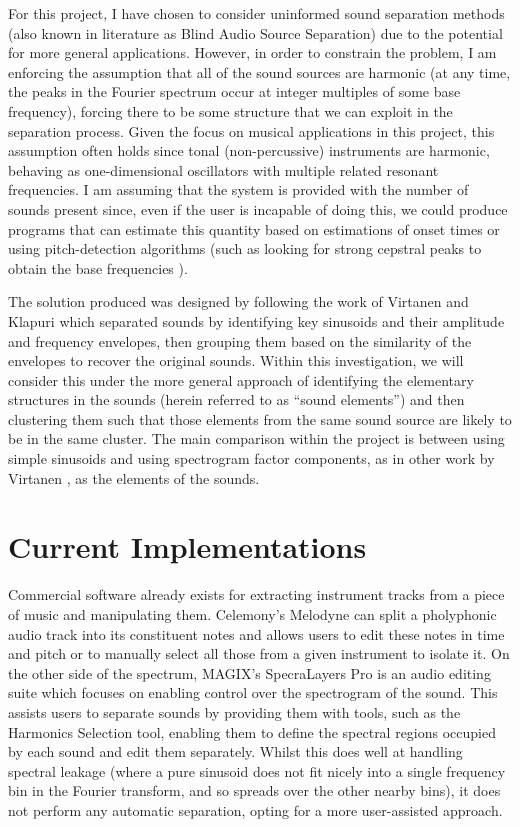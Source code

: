 \documentclass[12pt,a4paper,twoside,openright]{report}
\begin{document}
For this project, I have chosen to consider uninformed sound separation methods (also known in literature as Blind Audio Source Separation) due to the potential for more general applications. However, in order to constrain the problem, I am enforcing the assumption that all of the sound sources are harmonic (at any time, the peaks in the Fourier spectrum occur at integer multiples of some base frequency), forcing there to be some structure that we can exploit in the separation process. {\color{red}Given the focus on musical applications in this project, this assumption often holds since tonal (non-percussive) instruments are harmonic, behaving as one-dimensional oscillators with multiple related resonant frequencies.} I am assuming that the system is provided with the number of sounds present since, even if the user is incapable of doing this, we could produce programs that can estimate this quantity based on estimations of onset times or using pitch-detection algorithms (such as looking for strong cepstral peaks to obtain the base frequencies \cite{noll1967cepstrum}).

The solution produced was designed by following the work of Virtanen and Klapuri \cite{virtanen2000separation} which separated sounds by identifying key sinusoids and their amplitude and frequency envelopes, then grouping them based on the similarity of the envelopes to recover the original sounds. Within this investigation, we will consider this under the more general approach of identifying the elementary structures in the sounds (herein referred to as ``sound elements'') and then clustering them such that those elements from the same sound source are likely to be in the same cluster. The main comparison within the project is between using simple sinusoids and using spectrogram factor components, as in other work by Virtanen \cite{virtanen2003sound}, as the elements of the sounds.

\section{Current Implementations}

Commercial software already exists for extracting instrument tracks from a piece of music and manipulating them. Celemony's Melodyne \cite{melodyne} can split a pholyphonic audio track into its constituent notes and allows users to edit these notes in time and pitch or to manually select all those from a given instrument to isolate it. On the other side of the spectrum, MAGIX's SpecraLayers Pro \cite{spatralayers} is an audio editing suite which focuses on enabling control over the spectrogram of the sound. This assists users to separate sounds by providing them with tools, such as the Harmonics Selection tool, enabling them to define the spectral regions occupied by each sound and edit them separately. Whilst this does well at handling spectral leakage (where a pure sinusoid does not fit nicely into a single frequency bin in the Fourier transform, and so spreads over the other nearby bins), it does not perform any automatic separation, opting for a more user-assisted approach.
\end{document}
